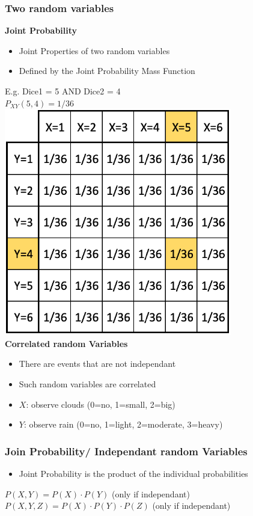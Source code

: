 \subsubsection{Two random variables}
\textbf{Joint Probability}
\begin{itemize}
    \item Joint Properties of two random variables
    \item Defined by the Joint Probability Mass Function
\end{itemize}
E.g. Dice1 = 5 AND Dice2 = 4\\
$P_{XY}(5,4) = 1/36$\\ 
\includegraphics[width=0.5\linewidth]{./img/joint_probability.png} \\
\textbf{Correlated random Variables}
\begin{itemize}
    \item There are events that are not independant
    \item Such random variables are correlated
    \item $X$: observe clouds (0=no, 1=small, 2=big)
    \item $Y$: observe rain (0=no, 1=light, 2=moderate, 3=heavy)
\end{itemize}

\subsubsection{Join Probability/ Independant random Variables}
\begin{itemize}
    \item Joint Probability is the product of the individual probabilities
\end{itemize}
$P(X,Y) = P(X) \cdot P(Y)$ (only if independant)\\ 
$P(X,Y,Z) = P(X) \cdot P(Y) \cdot P(Z)$ (only if independant)

